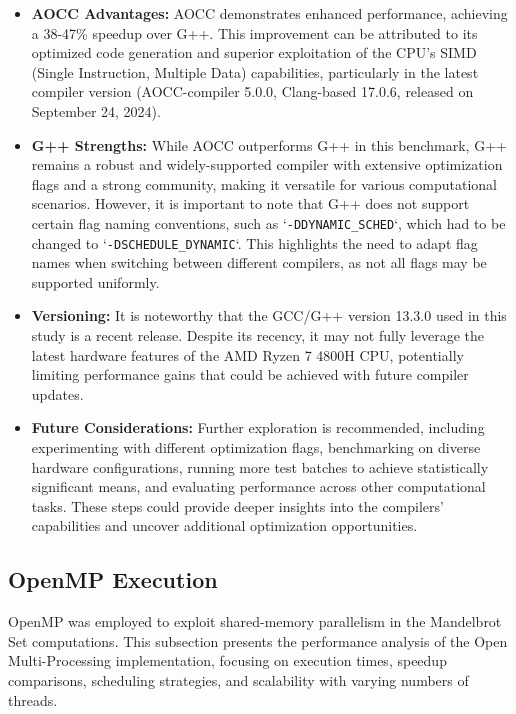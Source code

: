 \documentclass[
	report, %
	11pt, %
]{CSUniSchoolLabReport}
\newcounter{ct}
\begin{document}
\begin{itemize}
	\item \textbf{AOCC Advantages:} AOCC demonstrates enhanced performance, achieving a 38-47\% speedup over G++. This improvement can be attributed to its optimized code generation and superior exploitation of the CPU's SIMD (Single Instruction, Multiple Data) capabilities, particularly in the latest compiler version (AOCC-compiler 5.0.0, Clang-based 17.0.6, released on September 24, 2024).

	\item \textbf{G++ Strengths:} While AOCC outperforms G++ in this benchmark, G++ remains a robust and widely-supported compiler with extensive optimization flags and a strong community, making it versatile for various computational scenarios. However, it is important to note that G++ does not support certain flag naming conventions, such as `\texttt{-DDYNAMIC\_SCHED}`, which had to be changed to `\texttt{-DSCHEDULE\_DYNAMIC}`. This highlights the need to adapt flag names when switching between different compilers, as not all flags may be supported uniformly.

	\item \textbf{Versioning:} It is noteworthy that the GCC/G++ version 13.3.0 used in this study is a recent release. Despite its recency, it may not fully leverage the latest hardware features of the AMD Ryzen 7 4800H CPU, potentially limiting performance gains that could be achieved with future compiler updates.

	\item \textbf{Future Considerations:} Further exploration is recommended, including experimenting with different optimization flags, benchmarking on diverse hardware configurations, running more test batches to achieve statistically significant means, and evaluating performance across other computational tasks. These steps could provide deeper insights into the compilers' capabilities and uncover additional optimization opportunities.
\end{itemize}
\subsection{OpenMP Execution}

OpenMP was employed to exploit shared-memory parallelism in the Mandelbrot Set computations. This subsection presents the performance analysis of the Open Multi-Processing implementation, focusing on execution times, speedup comparisons, scheduling strategies, and scalability with varying numbers of threads.
\end{document}
